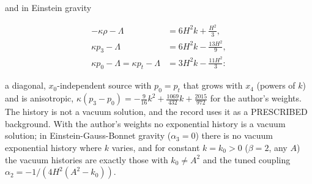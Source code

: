 \documentclass[11pt]{article}
\begin{document}
and in Einstein gravity

\[
\begin{aligned}
-\kappa\rho - \Lambda &= 6 H^2 k+\frac{H^2}{3}, \\
\kappa p_3 - \Lambda &= 6 H^2 k-\frac{13 H^2}{9}, \\
\kappa p_0 - \Lambda = \kappa p_t - \Lambda &= 3 H^2 k-\frac{11 H^2}{3}:
\end{aligned}
\]

a diagonal, $x_0$-independent source with $p_0 = p_t$ that grows with $x_4$ (powers of $k$) and is anisotropic, $\kappa(p_3 - p_0) = -\tfrac{9}{16}k^2 + \tfrac{1069}{432}k + \tfrac{2015}{972}$ for the author's weights. The history is not a vacuum solution, and the record uses it as a PRESCRIBED background. With the author's weights no exponential history is a vacuum solution; in Einstein-Gauss-Bonnet gravity ($\alpha_3 = 0$) there is no vacuum exponential history where $k$ varies, and for constant $k = k_0 > 0$ ($\beta = 2$, any $A$) the vacuum histories are exactly those with $k_0 \ne A^2$ and the tuned coupling $\alpha_2 = -1/(4H^2(A^2 - k_0))$.
\end{document}
